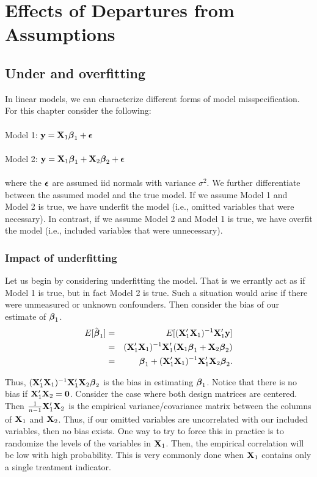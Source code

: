 \section{Effects of Departures from Assumptions}

\subsection{Under and overfitting}

In linear models, we can characterize different forms of model misspecification. For this chapter consider the following: \\ \ \\
\noindent
Model 1: $\mathbf{y} = \mathbf{X}_1 \boldsymbol{\beta}_1 + \boldsymbol{\epsilon}$ \\ \ \\ 
\noindent
Model 2: $\mathbf{y} = \mathbf{X}_1 \boldsymbol{\beta}_1 + \mathbf{X}_2 \boldsymbol{\beta}_2 + \boldsymbol{\epsilon}$ \\ \ \\
where the $\boldsymbol{\epsilon}$ are assumed iid normals with variance $\sigma^2$. 
We further differentiate between the assumed model and the true model. 
If we assume Model 1 and Model 2 is true, we have underfit the model (i.e., omitted variables that were necessary). 
In contrast, if we assume Model 2 and Model 1 is true, we have overfit the model (i.e., included variables that were
unnecessary). 

\subsubsection{Impact of underfitting}
Let us begin by considering underfitting the model. That is we errantly act as if Model 1 is true, but in fact Model 2 is true.
Such a situation would arise if there were unmeasured or unknown confounders. Then consider the
bias of our estimate of $\boldsymbol{\beta}_1$. 
\begin{eqnarray*}
E[\hat {\boldsymbol{\beta}}_1] &=& E[(\mathbf{X}_1' \mathbf{X}_1)^{-1} \mathbf{X}_1' \mathbf{y}]\\
&=& (\mathbf{X}_1' \mathbf{X}_1)^{-1} \mathbf{X}_1' (\mathbf{X}_1 \boldsymbol{\beta}_1 + \mathbf{X}_2 \boldsymbol{\beta}_2)\\
&=& \boldsymbol{\beta}_1 + (\mathbf{X}_1' \mathbf{X}_1)^{-1} \mathbf{X}_1' \mathbf{X}_2 \boldsymbol{\beta}_2.
\end{eqnarray*}

Thus, $(\mathbf{X}_1' \mathbf{X}_1)^{-1} \mathbf{X}_1' \mathbf{X}_2 \boldsymbol{\beta}_2$ is the bias in estimating $\boldsymbol{\beta}_1$. Notice
that there is no bias if $\mathbf{X}_1' \mathbf{X}_2 = \mathbf{0}$. Consider the case where both design matrices
are centered. Then $\frac{1}{n-1}\mathbf{X}_1' \mathbf{X}_2$ is the empirical 
variance/covariance matrix between the columns of $\mathbf{X}_1$ and $\mathbf{X}_2$. Thus, if our omitted
variables are uncorrelated with our included variables, then no bias exists. One way
to try to force this in practice is to randomize the levels of the variables in $\mathbf{X}_1$.
Then, the empirical correlation will be low with high probability. This is very commonly
done when $\mathbf{X}_1$ contains only a single treatment indicator.



